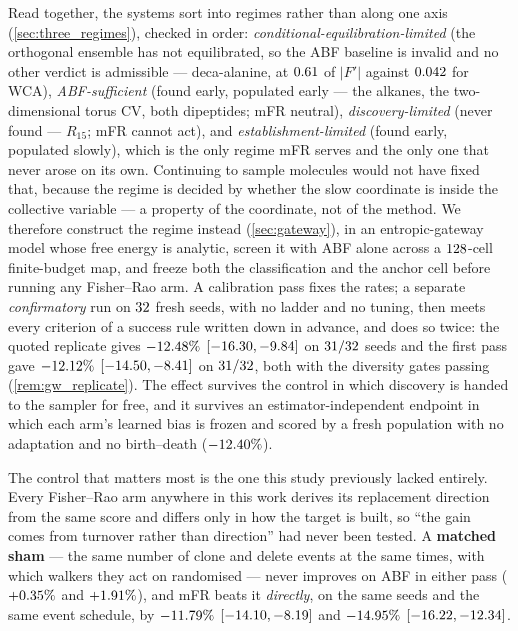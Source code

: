 Read together, the systems sort into regimes rather than along one axis
(\cref{sec:three_regimes}), checked in order: \emph{conditional-equilibration-limited} (the
orthogonal ensemble has not equilibrated, so the ABF baseline is invalid and no other verdict
is admissible --- deca-alanine, at $0.61$ of $|F'|$ against $0.042$ for WCA),
\emph{ABF-sufficient} (found early, populated early --- the
alkanes, the two-dimensional torus CV, both dipeptides; mFR neutral), \emph{discovery-limited}
(never found --- $R_{15}$; mFR cannot act), and \emph{establishment-limited} (found early,
populated slowly), which is the only regime mFR serves and the only one that never arose on
its own. Continuing to sample molecules would not have fixed that, because the regime is
decided by whether the slow coordinate is inside the collective variable --- a property of the
coordinate, not of the method. We therefore construct the regime instead
(\cref{sec:gateway}), in an entropic-gateway model whose free energy is analytic, screen it
with ABF alone across a $128$-cell finite-budget map, and freeze both the classification
and the anchor cell before running any Fisher--Rao arm. A calibration pass fixes the rates; a
separate \emph{confirmatory} run on $32$ fresh seeds, with no ladder and no tuning,
then meets every criterion of a success rule written down in advance, and does so twice: the
quoted replicate gives $-12.48\%$ $[-16.30, -9.84]$ on $31/32$ seeds and
the first pass gave $-12.12\%$ $[-14.50, -8.41]$ on $31/32$, both with
the diversity gates passing (\cref{rem:gw_replicate}). The
effect survives the control in which discovery is handed to the sampler for free, and it
survives an estimator-independent endpoint in which each arm's learned bias is frozen and
scored by a fresh population with no adaptation and no birth--death ($-12.40\%$).

The control that matters most is the one this study previously lacked entirely. Every
Fisher--Rao arm anywhere in this work derives its replacement direction from the same score
and differs only in how the target is built, so ``the gain comes from turnover rather than
direction'' had never been tested. A \textbf{matched sham} --- the same number of clone and delete events
at the same times, with which walkers they act on randomised --- never improves on ABF in
either pass ($+0.35\%$ and $+1.91\%$), and mFR beats it \emph{directly}, on
the same seeds and the same event schedule, by $-11.79\%$
$[-14.10, -8.19]$ and $-14.95\%$ $[-16.22, -12.34]$.

